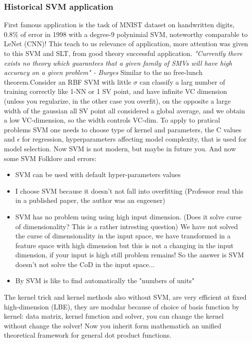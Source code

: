 \documentclass[12pt]{book}
\begin{document}
\subsubsection{Historical SVM application}
First famous application is the task of MNIST dataset on handwritten digits, $0.8\%$ of error in 1998 with a degree-9 polynimial SVM, noteworthy comparable to LeNet (CNN)!\newline
This teach to us relevance of application, more attention was given to this SVM and SLT, from good theory successful application.\newline
\newline
\textit{"Currently there exists no theory which guarantees that a given family of SMVs will have high accuracy on a given problem" - Burges}\newline\newline
Similar to the no free-lunch theorem.\newline\newline Consider an RBF SVM with little $\sigma$ can classify a larg number of training correctly like 1-NN or 1 SV point, and have infinite VC dimension (unless you regularize, in the other case you overfit), on the opposite a large width of the gaussian all SV point all considered a global average, and we obtain a low VC-dimension, so the width controls VC-dim.\newline
To apply to pratical problems SVM one needs to choose type of kernel and parameters, the C values and $\epsilon$ for regression, hyperparameters affecting model complexity, that is used for model selection. Now SVM is not modern, but maybe in future you.\newline
\newline
And now some SVM Folklore and errors:
\begin{itemize}
	\item SVM can be used with default hyper-parameters values
	\item I choose SVM because it doesn't not fall into overfitting (Professor read this in a published paper, the author was an engeener)
	\item SVM has no problem using using high input dimension. (Does it solve curse of dimensionality? This is a rather intresting question)
	\subitem We have not solved the curse of dimensionality in the input space, we have transformed in a feature space with high dimension but this is not a changing in the input dimension, if your input is high still problem remains! So the answer is SVM doesn't not solve the CoD in the input space... 
	\item By SVM is like to find automatically the "numbers of units"	
\end{itemize}
The kernel trick and kernel methods also without SVM, are very efficient at fixed high-dimension (LBE), they are modular because of choice of basis function by kernel: data matrix, kernel function and solver, you can change the kernel without change the solver! Now you inherit form mathematich an unified theoretical framework for general dot product functions.
\end{document}
